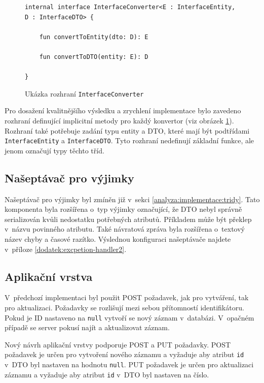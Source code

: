         
        \begin{figure} %
            \begin{verbatim}
internal interface InterfaceConverter<E : InterfaceEntity, D : InterfaceDTO> {

    fun convertToEntity(dto: D): E

    fun convertToDTO(entity: E): D

}
            \end{verbatim}
            \caption{Ukázka rozhraní \texttt{InterfaceConverter}} 
            \label{code:interface-converterl}
        \end{figure}
        Pro dosažení kvalitnějšího výsledku a zrychlení implementace bylo zavedeno rozhraní definující implicitní metody pro každý konvertor (viz obrázek \ref{code:interface-converterl}). Rozhraní také potřebuje zadání typu entity a DTO, které mají být podtřídami \verb|InterfaceEntity| a \verb|InterfaceDTO|. Tyto rozhraní nedefinují základní funkce, ale jenom označují typy těchto tříd. 
        
    \subsection{Našeptávač pro výjimky}
        Našeptávač pro výjimky byl zmíněn již v~sekci \ref{analyza:implementace:tridy}. Tato komponenta byla rozšířena o~typ výjimky označující, že DTO nebyl správně serializován kvůli nedostatku potřebných atributů. Příkladem může být překlep v~názvu povinného atributu. Také návratová zpráva byla rozšířena o~textový název chyby a časové razítko. Výslednou konfiguraci našeptávače najdete v~příloze \ref{dodatek:excpetion-handler2}.
        
    \subsection{Aplikační vrstva}
        V~předchozí implementaci byl použit POST požadavek, jak pro vytváření, tak pro aktualizaci. Požadavky se rozlišují mezi sebou přítomností identifikátoru. Pokud je ID nastaveno na \verb|null| vytvoří se nový záznam v~databázi. V~opačném případě se server pokusí najít a aktualizovat záznam.
        
        
        Nový návrh aplikační vrstvy podporuje POST a PUT požadavky. POST požadavek je určen pro vytvoření nového záznamu a vyžaduje aby atribut \verb|id| v~DTO byl nastaven na hodnotu \verb|null|. PUT požadavek je určen pro aktualizaci záznamu a vyžaduje aby atribut \verb|id| v~DTO byl nastaven na číslo.
        
